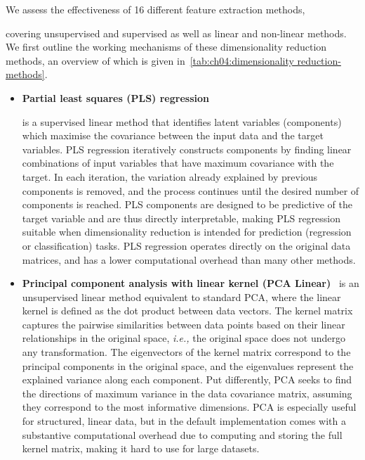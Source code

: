 We assess the effectiveness of 16 different feature extraction methods, 

covering unsupervised and supervised as well as linear and non-linear methods.
We first outline the working mechanisms of these dimensionality reduction methods, an overview of which is given in~\cref{tab:ch04:dimensionality reduction-methods}.

\begin{itemize}
    \item \textbf{Partial least squares (PLS) regression}~\citep{DeeEtAl90} 

    is a supervised linear method that identifies latent variables (components) which maximise the covariance between the input data and the target variables.  PLS regression
    iteratively constructs components by finding linear combinations of input variables that have maximum covariance with the target. In each iteration, the variation already explained by previous components is removed, and the process continues until the desired number of components is reached. PLS components are designed to be predictive of the target variable and are thus directly interpretable, making PLS regression suitable when dimensionality reduction is intended for prediction (regression or classification) tasks. PLS regression operates directly on the original data matrices, and has a lower computational overhead than many other methods.
    \item \textbf{Principal component analysis with linear kernel (PCA Linear)}~\citep{Pearson1901} is an unsupervised linear method equivalent to standard PCA, where the linear kernel is defined as the dot product between data vectors. The kernel matrix captures the pairwise similarities between data points based on their linear relationships in the original space, \emph{i.e.,} the original space does not undergo any transformation. The eigenvectors of the kernel matrix correspond to the principal components in the original space, and the eigenvalues represent the explained variance along each component. Put differently, PCA seeks to find the directions of maximum variance in the data covariance matrix, assuming they correspond to the most informative dimensions. PCA is especially useful for structured, linear data, but in the default implementation comes with a substantive computational overhead due to computing and storing the full kernel matrix, making it hard to use for large datasets. 


\end{itemize}
